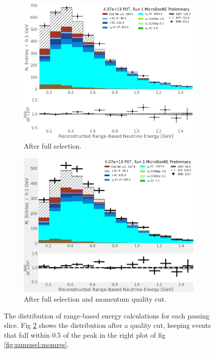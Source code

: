 \begin{figure}[ht] 
\begin{center}
    \begin{subfigure}[b]{0.45\textwidth}
    \centering
    \includegraphics[width=1.00\textwidth]{NuMuCCsel/Images/Ryan/Run1_recoErange_FullSel.jpg}
    \caption{\label{fig:NuMUCCsel:ryan:noPQuality} After full selection.}
    \end{subfigure}
    \begin{subfigure}[b]{0.45\textwidth}
    \centering
    \includegraphics[width=1.00\textwidth]{NuMuCCsel/Images/Ryan/Run1_recoErange_pquality.jpg}
    \caption{\label{fig:NuMUCCsel:ryan:withPQuality} After full selection and momentum quality cut.}
    \end{subfigure}
\caption{The distribution of range-based energy calculations for each passing slice. Fig \ref{fig:NuMUCCsel:ryan:withPQuality} shows the distribution after a quality cut, keeping events that fall within 0.5 of the peak in the right plot of fig \ref{fig:numusel:momres}.}
\label{fig:NuMUCCsel:ryan:PQuality}
\end{center}
\end{figure}


